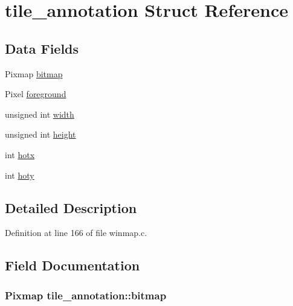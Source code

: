 \hypertarget{structtile__annotation}{\section{tile\+\_\+annotation Struct Reference}
\label{structtile__annotation}
}
\subsection*{Data Fields}
\begin{DoxyCompactItemize}
\item 
Pixmap \hyperlink{structtile__annotation_a608fc9986eb459e676f77d7f3b4822a7}{bitmap}
\item 
Pixel \hyperlink{structtile__annotation_a1bc456a3e868aec0ecc8c92e6244fa59}{foreground}
\item 
unsigned int \hyperlink{structtile__annotation_abebdada9a87e5e8252ad6213f48aee66}{width}
\item 
unsigned int \hyperlink{structtile__annotation_acf8b8bf29e89acd084f07e7b55e20c79}{height}
\item 
int \hyperlink{structtile__annotation_a162bca91c97a60e8099c5f9305210258}{hotx}
\item 
int \hyperlink{structtile__annotation_ad2ca18d1296b8e792ee8e70bad9fd524}{hoty}
\end{DoxyCompactItemize}


\subsection{Detailed Description}


Definition at line 166 of file winmap.\+c.



\subsection{Field Documentation}
\hypertarget{structtile__annotation_a608fc9986eb459e676f77d7f3b4822a7}{
\subsubsection[{bitmap}]{\setlength{\rightskip}{0pt plus 5cm}Pixmap tile\+\_\+annotation\+::bitmap}}\label{structtile__annotation_a608fc9986eb459e676f77d7f3b4822a7}


